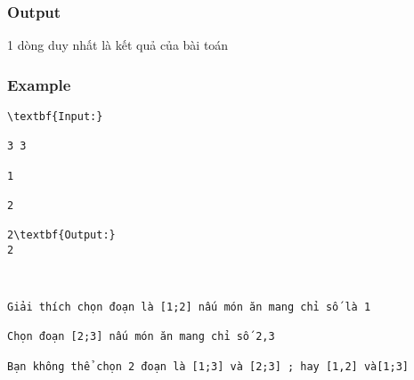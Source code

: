 \subsubsection{   Output  }

   1 dòng duy nhất là kết quả của bài toán  

\subsubsection{   Example  }
\begin{verbatim}
\textbf{Input:}

3 3

1

2

2\textbf{Output:}
2\end{verbatim}
\begin{verbatim}


Giải thích chọn đoạn là [1;2] nấu món ăn mang chỉ số là 1

Chọn đoạn [2;3] nấu món ăn mang chỉ số 2,3

Bạn không thể chọn 2 đoạn là [1;3] và [2;3] ; hay [1,2] và[1;3]\end{verbatim}